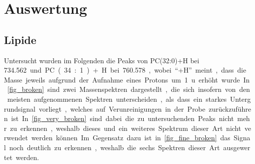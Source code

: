 \clearpage
\section{Auswertung}

\subsection{Lipide}

Untersucht wurden im Folgenden die Peaks von PC(32:0)+H bei \SI{734.562} und PC(34:1)+H bei \SI{760,578}, wobei \enquote{+H} meint, dass die Masse jeweils aufgrund der Aufnahme eines Protons um \SI{1}{u} erhöht wurde.
In \cref{fig_broken} sind zwei Massenspektren dargestellt, die sich insofern von den meisten aufgenommenen Spektren unterscheiden, als dass ein starkes Untergrundsignal vorliegt, welches auf Verunreinigungen in der Probe zurückzuführen ist.
In \cref{fig_very_broken} sind dabei die zu untersuchenden Peaks nicht mehr zu erkennen, weshalb dieses und ein weiteres Spektrum dieser Art nicht verwendet werden können.
Im Gegensatz dazu ist in \cref{fig_fine_broken} das Signal noch deutlich zu erkennen, weshalb die sechs Spektren dieser Art ausgewertet werden.

